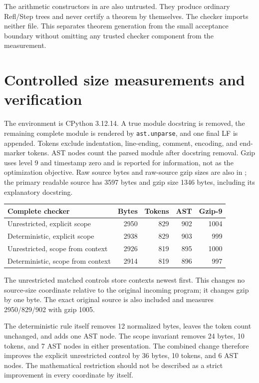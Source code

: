 \documentclass[11pt,letterpaper]{article}
\theoremstyle{definition}
\begin{document}
The arithmetic constructors in  are also untrusted.
They produce ordinary Refl/Step trees and never certify a theorem by
themselves. The checker imports neither file. This separates theorem
generation from the small acceptance boundary without omitting any
trusted checker component from the measurement.

\section{Controlled size measurements and verification}
\label{sec:measurements}

The environment is CPython 3.12.14. A true module docstring is removed,
the remaining complete module is rendered by \texttt{ast.unparse},
and one final LF is appended. Tokens exclude indentation, line-ending,
comment, encoding, and end-marker tokens. AST nodes count the parsed
module after docstring removal. Gzip uses level 9 and timestamp zero
and is reported for information, not as the optimization objective.
Raw source bytes and raw-source gzip sizes are also in
; the primary readable source has 3597 bytes
and gzip size 1346 bytes, including its explanatory docstring.

\begin{center}
\begin{tabular}{lrrrr}
\toprule
Complete checker & Bytes & Tokens & AST & Gzip-9\\
\midrule
Unrestricted, explicit scope & 2950 & 829 & 902 & 1004 \\
Deterministic, explicit scope & 2938 & 829 & 903 & 999 \\
Unrestricted, scope from context & 2926 & 819 & 895 & 1000 \\
Deterministic, scope from context & 2914 & 819 & 896 & 997 \\
\bottomrule
\end{tabular}
\end{center}

The unrestricted matched controls store contexts newest first. This
changes no source-size coordinate relative to the original incoming
program; it changes gzip by one byte. The exact original source is
also included and measures 2950/829/902 with gzip 1005.

The deterministic rule itself removes 12 normalized bytes, leaves the
token count unchanged, and adds one AST node. The scope invariant removes
24 bytes, 10 tokens, and 7 AST nodes in either presentation. The combined
change therefore improves the explicit unrestricted control by 36 bytes,
10 tokens, and 6 AST nodes. The mathematical restriction should not be
described as a strict improvement in every coordinate by itself.
\end{document}
